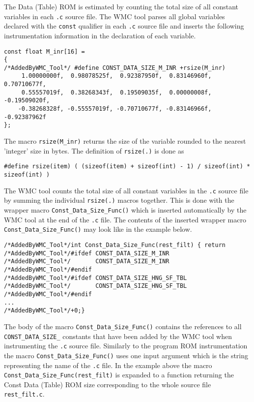 The Data (Table) ROM is estimated by counting the total size of all constant variables in each \verb|.c| source file. The WMC tool parses all global variables declared with the \verb|const| qualifier in each \verb|.c| source file and inserts the following instrumentation information in the declaration of each variable.

\begin{Verbatim}[fontsize=\small]
const float M_inr[16] =
{
/*AddedByWMC_Tool*/ #define CONST_DATA_SIZE_M_INR +rsize(M_inr)
     1.00000000f,  0.98078525f,  0.92387950f,  0.83146960f,  0.70710677f,
     0.55557019f,  0.38268343f,  0.19509035f,  0.00000008f, -0.19509020f,
    -0.38268328f, -0.55557019f, -0.70710677f, -0.83146966f, -0.92387962f
};
\end{Verbatim}

The macro \verb|rsize(M_inr)| returns the size of the variable rounded to the nearest 'integer' size in bytes. The definition of \verb|rsize(.)| is done as

\begin{Verbatim}[fontsize=\small]
#define rsize(item) ( (sizeof(item) + sizeof(int) - 1) / sizeof(int) * sizeof(int) )
\end{Verbatim}

The WMC tool counts the total size of all constant variables in the \verb|.c| source file by summing the individual \verb|rsize(.)| macros together. This is done with the wrapper macro \verb|Const_Data_Size_Func()| which is inserted automatically by the WMC tool at the end of the \verb|.c| file. The contents of the inserted wrapper macro \verb|Const_Data_Size_Func()| may look like in the example below.

\begin{Verbatim}[fontsize=\small]
/*AddedByWMC_Tool*/int Const_Data_Size_Func(rest_filt) { return
/*AddedByWMC_Tool*/#ifdef CONST_DATA_SIZE_M_INR
/*AddedByWMC_Tool*/       CONST_DATA_SIZE_M_INR
/*AddedByWMC_Tool*/#endif
/*AddedByWMC_Tool*/#ifdef CONST_DATA_SIZE_HNG_SF_TBL
/*AddedByWMC_Tool*/       CONST_DATA_SIZE_HNG_SF_TBL
/*AddedByWMC_Tool*/#endif
...
/*AddedByWMC_Tool*/+0;}
\end{Verbatim}

The body of the macro \verb|Const_Data_Size_Func()| contains the references to all \verb|CONST_DATA_SIZE_| constants that have been added by the WMC tool  when instrumenting the  \verb|.c| source file. Similarly to the program ROM instrumentation the macro \verb|Const_Data_Size_Func()| uses one input argument which is the string representing the name of the \verb|.c| file. In the example above the macro \verb|Const_Data_Size_Func(rest_filt)| is expanded to a function returning the Const Data (Table) ROM size corresponding to the whole source file \verb|rest_filt.c|.

